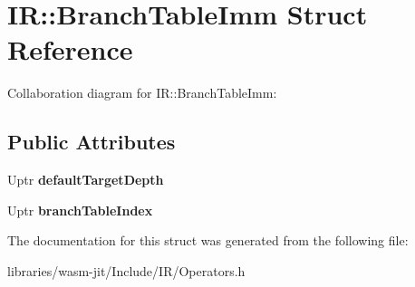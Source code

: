 \hypertarget{struct_i_r_1_1_branch_table_imm}{}\section{IR\+:\+:Branch\+Table\+Imm Struct Reference}
\label{struct_i_r_1_1_branch_table_imm}


Collaboration diagram for IR\+:\+:Branch\+Table\+Imm\+:
\subsection*{Public Attributes}
\begin{DoxyCompactItemize}
\item 
\mbox{\label{struct_i_r_1_1_branch_table_imm_a9d63b9dbb2610daabb09735384f7ab67}} 
Uptr {\bfseries default\+Target\+Depth}
\item 
\mbox{\label{struct_i_r_1_1_branch_table_imm_a997ecb7055eee01f77e205f495f0cb9c}} 
Uptr {\bfseries branch\+Table\+Index}
\end{DoxyCompactItemize}


The documentation for this struct was generated from the following file\+:\begin{DoxyCompactItemize}
\item 
libraries/wasm-\/jit/\+Include/\+I\+R/Operators.\+h\end{DoxyCompactItemize}
